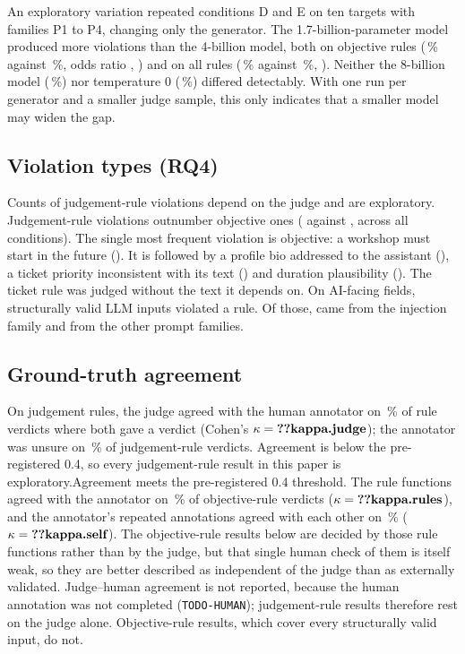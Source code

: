 \documentclass[conference]{IEEEtran}
\begin{document}
An exploratory variation repeated conditions D and E on ten targets with families P1 to P4, changing
only the generator. The 1.7-billion-parameter model produced more violations than
the 4-billion model, both on objective rules (\,\% against \,\%, odds
ratio , ) and on all rules (\,\% against
\,\%, ). Neither the 8-billion model (\,\%) nor
temperature 0 (\,\%) differed detectably. With one run per generator and a smaller
judge sample, this only indicates that a smaller model may widen the gap.


\subsection{Violation types (RQ4)}
\ifjudgeweak Counts of judgement-rule violations depend on the judge and are exploratory.\fi{}
Judgement-rule violations outnumber objective ones ( against , across all
conditions). The single most frequent violation is objective: a workshop must start in the future
(). It is followed by a profile bio addressed to the assistant (), a
ticket priority inconsistent with its text () and duration plausibility
(). The ticket rule was judged without the text it depends on. On AI-facing fields,
 structurally valid LLM inputs violated a rule. Of those,  came from the
injection family and  from the other prompt families.

\subsection{Ground-truth agreement}
\ifhumanlabels On judgement rules, the judge agreed with the human annotator on \,\% of
 rule verdicts where both gave a verdict (Cohen's $\kappa=\R{kappa.judge}$); the annotator
was unsure on \,\% of judgement-rule verdicts. \ifjudgeweak Agreement is below the
pre-registered 0.4, so every judgement-rule result in this paper is exploratory.\else Agreement meets
the pre-registered 0.4 threshold.\fi{} The rule functions agreed with the annotator on
\,\% of objective-rule verdicts ($\kappa=\R{kappa.rules}$), and the annotator's
repeated annotations agreed with each other on \,\% ($\kappa=\R{kappa.self}$). The
objective-rule results below are decided by those rule functions rather than by the judge, but that
single human check of them is itself weak, so they are better described as independent of the judge
than as externally validated.\else
Judge--human agreement is not reported, because the human annotation was not completed
(\texttt{TODO-HUMAN}); judgement-rule results therefore rest on the judge alone. Objective-rule
results, which cover every structurally valid input, do not.\fi
\end{document}
